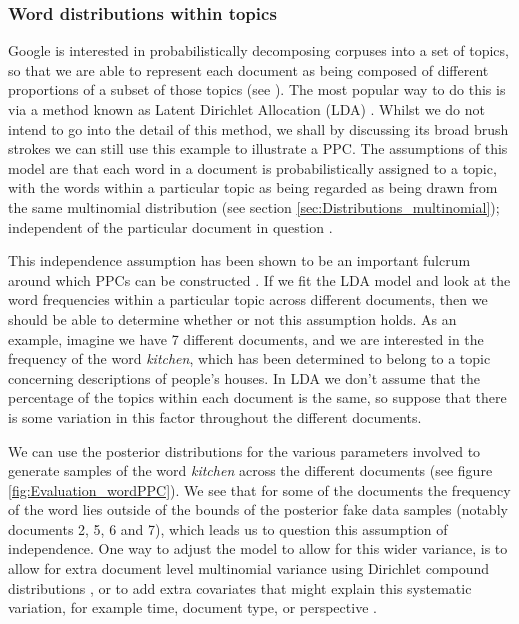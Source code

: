 \documentclass[11pt,fullpage]{book}
\begin{document}
\subsubsection{Word distributions within topics}
Google is interested in probabilistically decomposing corpuses into a set of topics, so that we are able to represent each document as being composed of different proportions of a subset of those topics (see \cite{mimno2011bayesian}). The most popular way to do this is via a method known as Latent Dirichlet Allocation (LDA) \cite{blei2003latent}. Whilst we do not intend to go into the detail of this method, we shall by discussing its broad brush strokes we can still use this example to illustrate a PPC. The assumptions of this model are that each word in a document is probabilistically assigned to a topic, with the words within a particular topic as being regarded as being drawn from the same multinomial distribution (see section \ref{sec:Distributions_multinomial}); independent of the particular document in question \cite{blei2003latent}. 

This independence assumption has been shown to be an important fulcrum around which PPCs can be constructed \cite{mimno2011bayesian}. If we fit the LDA model and look at the word frequencies within a particular topic across different documents, then we should be able to determine whether or not this assumption holds. As an example, imagine we have 7 different documents, and we are interested in the frequency of the word \textit{kitchen}, which has been determined to belong to a topic concerning descriptions of people's houses. In LDA we don't assume that the percentage of the topics within each document is the same, so suppose that there is some variation in this factor throughout the different documents. 

We can use the posterior distributions for the various parameters involved to generate samples of the word \textit{kitchen} across the different documents (see figure \ref{fig:Evaluation_wordPPC}). We see that for some of the documents the frequency of the word lies outside of the bounds of the posterior fake data samples (notably documents 2, 5, 6 and 7), which leads us to question this assumption of independence. One way to adjust the model to allow for this wider variance, is to allow for extra document level multinomial variance using Dirichlet compound distributions \cite{mimno2011bayesian}, or to add extra covariates that might explain this systematic variation, for example time, document type, or perspective \cite{blei2003latent}.
\end{document}
